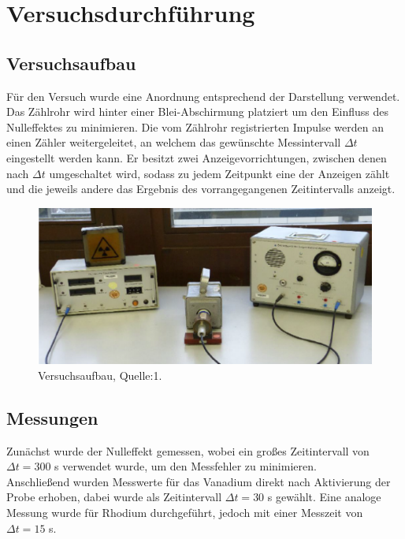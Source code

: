 \section{Versuchsdurchführung}
\label{sec:durchfuehrung}
\subsection{Versuchsaufbau}
\label{sec:aufbau}

Für den Versuch wurde eine Anordnung entsprechend der Darstellung verwendet. Das Zählrohr wird hinter einer 
Blei-Abschirmung platziert um den Einfluss des Nulleffektes zu minimieren. Die vom Zählrohr registrierten 
Impulse werden an einen Zähler weitergeleitet, an welchem das gewünschte Messintervall $\Delta t$ eingestellt 
werden kann. Er besitzt zwei Anzeigevorrichtungen, zwischen denen nach $\Delta t$ umgeschaltet wird, sodass 
zu jedem Zeitpunkt eine der Anzeigen zählt und die jeweils andere das Ergebnis des vorrangegangenen 
Zeitintervalls anzeigt.
\begin{figure}
    \centering
    \includegraphics{aufbau.pdf}
    \caption{Versuchsaufbau, Quelle:1.}
    
  \end{figure}

\subsection{Messungen}
\label{sec:messungen}
Zunächst wurde der Nulleffekt gemessen, wobei ein großes Zeitintervall von $\Delta t=300$ s verwendet 
wurde, um den Messfehler zu minimieren. \\
Anschließend wurden Messwerte für das Vanadium direkt nach Aktivierung der Probe erhoben, dabei wurde 
als Zeitintervall $\Delta t=30$ s gewählt. Eine analoge Messung wurde für Rhodium durchgeführt, jedoch 
mit einer Messzeit von $\Delta t=15$ s.  